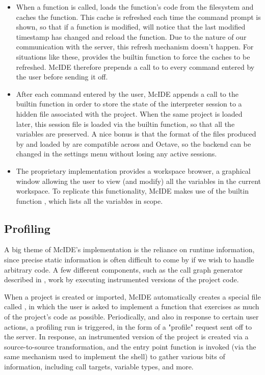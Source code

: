 \begin{itemize}

\item When a function is called, \matlab loads the function's code from the
filesystem and caches the function. This cache is refreshed each time the
command prompt is shown, so that if a function is modified, \matlab will notice
that the last modified timestamp has changed and reload the function. Due to
the nature of our communication with the \matlab server, this refresh mechanism
doesn't happen. For situations like these, \matlab provides the 
builtin function to force the caches to be refreshed. McIDE therefore prepends
a call to  to every command entered by the user before sending it
off.

\item After each command entered by the user, McIDE appends a call to the
 \matlab builtin function in order to store the state of the
interpreter session to a hidden file associated with the project. When the same
project is loaded later, this session file is loaded via the builtin
 function, so that all the variables are preserved. A nice bonus is
that the format of the files produced by  and loaded by 
are compatible across \matlab and Octave, so the backend can be changed in the
settings menu without losing any active sessions.

\item The proprietary \matlab implementation provides a workspace browser, a
graphical window allowing the user to view (and modify) all the variables in
the current workspace. To replicate this functionality, McIDE makes use of the
\matlab builtin function , which lists all the variables in scope.

\end{itemize}

\subsection{Profiling}

A big theme of McIDE's implementation is the reliance on runtime information,
since precise static information is often difficult to come by if we wish to
handle arbitrary \matlab code. A few different components, such as the call
graph generator described in , work
by executing instrumented versions of the project code.

When a project is created or imported, McIDE automatically creates a special
file called , in which the user is asked to implement
a function that exercises as much of the project's code as possible.
Periodically, and also in response to certain user actions, a profiling run is
triggered, in the form of a "profile" request sent off to the server. In
response, an instrumented version of the project is created via a
source-to-source transformation, and the entry point function is invoked (via
the same mechanism used to implement the \matlab shell) to gather various bits
of information, including call targets, variable types, and more.
